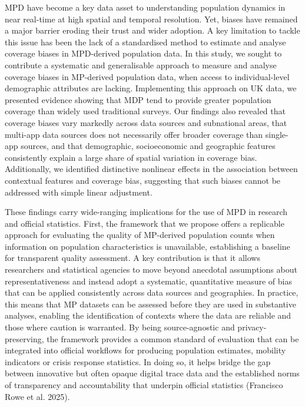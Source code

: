 \documentclass{article}
\begin{document}
MPD have become a key data asset to understanding population dynamics in
near real-time at high spatial and temporal resolution. Yet, biases have
remained a major barrier eroding their trust and wider adoption. A key
limitation to tackle this issue has been the lack of a standardised
method to estimate and analyse coverage biases in MPD-derived population
data. In this study, we sought to contribute a systematic and
generalisable approach to measure and analyse coverage biases in
MP-derived population data, when access to individual-level demographic
attributes are lacking. Implementing this approach on UK data, we
presented evidence showing that MDP tend to provide greater population
coverage than widely used traditional surveys. Our findings also
revealed that coverage biases vary markedly across data sources and
subnational areas, that multi-app data sources does not necessarily
offer broader coverage than single-app sources, and that demographic,
socioeconomic and geographic features consistently explain a large share
of spatial variation in coverage bias. Additionally, we identified
distinctive nonlinear effects in the association between contextual
features and coverage bias, suggesting that such biases cannot be
addressed with simple linear adjustment.

These findings carry wide-ranging implications for the use of MPD in
research and official statistics. First, the framework that we propose
offers a replicable approach for evaluating the quality of MP-derived
population counts when information on population characteristics is
unavailable, establishing a baseline for transparent quality assessment.
A key contribution is that it allows researchers and statistical
agencies to move beyond anecdotal assumptions about representativeness
and instead adopt a systematic, quantitative measure of bias that can be
applied consistently across data sources and geographies. In practice,
this means that MP datasets can be assessed before they are used in
substantive analyses, enabling the identification of contexts where the
data are reliable and those where caution is warranted. By being
source-agnostic and privacy-preserving, the framework provides a common
standard of evaluation that can be integrated into official workflows
for producing population estimates, mobility indicators or crisis
response statistics. In doing so, it helps bridge the gap between
innovative but often opaque digital trace data and the established norms
of transparency and accountability that underpin official statistics
(Francisco Rowe et al. 2025).
\end{document}
